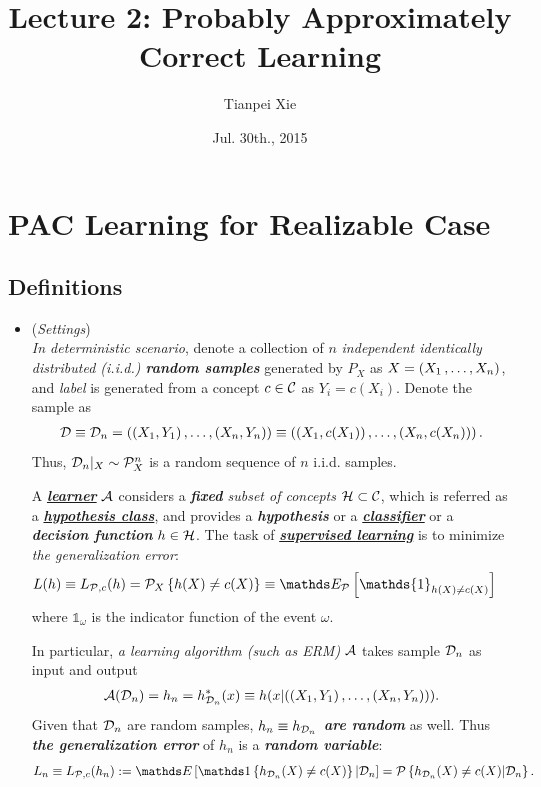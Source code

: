 \documentclass[11pt]{article}
\begin{document}
\title{Lecture 2: Probably Approximately Correct Learning}
\author{ Tianpei Xie}
\date{ Jul. 30th., 2015 }
\maketitle
\tableofcontents
\newpage
\section{PAC Learning for Realizable Case}
\subsection{Definitions}
\begin{itemize}
\item \begin{remark} (\emph{Settings}) \\
\emph{In deterministic scenario}, denote a collection of $n$ \emph{independent identically distributed (i.i.d.) \textbf{random samples}} generated by $P_X$ as $X = \left(X_1 \,{,}\ldots{,}\, X_n\right)$, and \emph{label} is generated from a concept $c \in {\mathcal C}$ as $Y_i = c(X_i)$. Denote the sample as 
\begin{align*}
{\mathcal D} \equiv {\mathcal D}_n = \left((X_1, Y_1) \,{,}\ldots{,}\, (X_n, Y_n)\right) \equiv  \left((X_1, c(X_1)) \,{,}\ldots{,}\, (X_n, c(X_n))\right) .
\end{align*} Thus, ${\mathcal D}_n|_{X} \sim {\mathcal P}_X^n$ is a random sequence of $n$ i.i.d. samples.

A \underline{\emph{\textbf{learner}}} ${\mathcal A}$  considers a \emph{\textbf{fixed} subset of concepts}  ${\mathcal H}\subset {\mathcal C}$, which is referred as a \underline{\emph{\textbf{hypothesis class}}}, and provides a \emph{\textbf{hypothesis}} or a \underline{\emph{\textbf{classifier}}} or a \emph{\textbf{decision function}} $h\in {\mathcal H}$. The task of \underline{\emph{\textbf{supervised learning}}} is to minimize \emph{the generalization error}:
\begin{align*}
L(h) \equiv L_{\cP, c}(h) &= \cP_{X}\set{h(X) \neq c(X)} \equiv \E{\cP}{\mathds{1}_{h(X)\neq c(X)}}
\end{align*} where $\mathds{1}_{\omega}$ is the indicator function of the event $\omega$. 

In particular, \emph{a learning algorithm (such as ERM)} ${\mathcal A}$ takes sample ${\mathcal D}_n$ as input and output 
\begin{align*}
{\mathcal A}({\mathcal D}_n) = h_n =  h_{{\mathcal D}_n}^{*}(x)  \equiv  h(x | ((X_1, Y_1) \,{,}\ldots{,}\, (X_n, Y_n)) ).
\end{align*}  Given that ${\mathcal D}_n$ are random samples, \emph{\textbf{$h_n \equiv h_{{\mathcal D}_n}$ are random}} as well. Thus \emph{\textbf{the generalization error}} of $h_n$ is a \emph{\textbf{random variable}}: 
\begin{align*}
L_n \equiv L_{\cP, c}(h_n) := \E{}{ \ind{h_{\cD_n}(X) \neq c(X)}| \cD_n} = \cP\set{h_{\cD_n}(X) \neq c(X) | \cD_n}.
\end{align*}
\end{remark}



\end{itemize}
\end{document}
